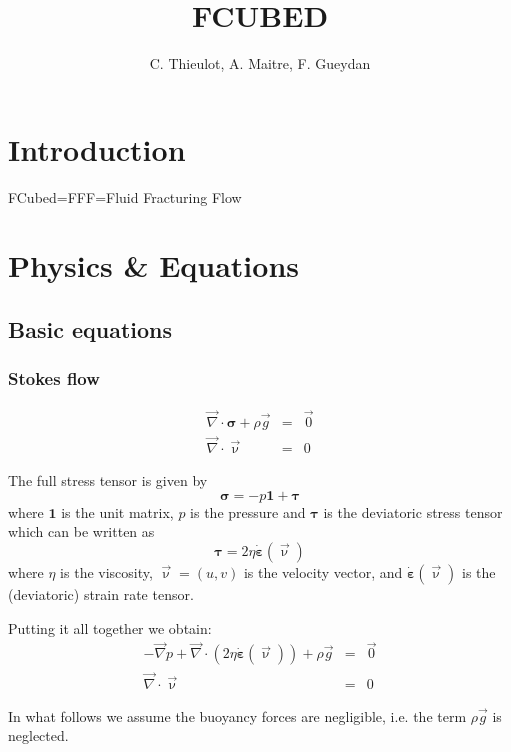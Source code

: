 \documentclass[a4paper]{article}
\title{FCUBED}
\author{C. Thieulot, A. Maitre, F. Gueydan}
\begin{document}
\maketitle
\tableofcontents

\newpage
\section{Introduction}

FCubed=FFF=Fluid Fracturing Flow 

\section{Physics \& Equations}

\subsection{Basic equations}


\subsubsection{Stokes flow}

\begin{eqnarray}
\vec\nabla \cdot \bm \sigma + \rho \vec{g} &=& \vec{0} \\
\vec\nabla \cdot \vec\upnu &=& 0
\end{eqnarray}

The full stress tensor is given by
\[
\bm\sigma = -p {\bm 1} +  \bm \tau
\]
where ${\bm 1}$ is the unit matrix, $p$ is the pressure and 
${\bm\tau}$ is the deviatoric stress tensor which can be 
written as
\[
\bm\tau = 2 \eta \dot{\bm \varepsilon}(\vec\upnu)
\]
where $\eta$ is the viscosity, $\vec{\upnu}=(u,v)$ is the velocity vector, 
and $\dot{\bm \varepsilon}(\vec\upnu)$ is the (deviatoric) 
strain rate tensor.

Putting it all together we obtain:
\begin{eqnarray}
-\vec\nabla p + \vec\nabla \cdot (2 \eta \dot{\bm \varepsilon}(\vec\upnu)) + \rho \vec{g} &=& \vec{0} \\
\vec\nabla \cdot \vec\upnu &=& 0
\end{eqnarray}

In what follows we assume the buoyancy forces are negligible, i.e. 
the term $\rho \vec{g}$ is neglected.


\end{document}
